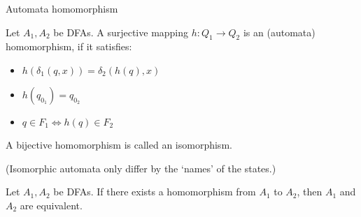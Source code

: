 \documentclass[handout]{beamer}
\begin{document}
\begin{frame}{Automata homomorphism}

    \begin{definition}
        Let $A_1,A_2$ be DFAs. A surjective mapping $h: Q_1\rightarrow Q_2$ is an \alert{(automata) homomorphism}, if it satisfies:
        \begin{itemize}
            \item $h(\delta_1(q,x))=\delta_2(h(q),x)$
            \item $h(q_{0_1})=q_{0_2}$            
            \item $q\in F_1 \Leftrightarrow h(q)\in F_2$
        \end{itemize}
        A bijective homomorphism is called an \alert{isomorphism}.
    \end{definition}

    (Isomorphic automata only differ by the `names' of the states.)

    \medskip

    \begin{theorem}
        Let $A_1,A_2$ be DFAs. If there exists a homomorphism from $A_1$ to $A_2$, then $A_1$ and $A_2$ are equivalent.
    \end{theorem}

\end{frame}
\end{document}
